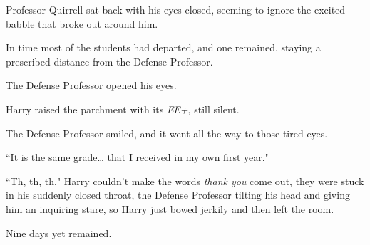 Professor Quirrell sat back with his eyes closed, seeming to ignore the excited babble that broke out around him.

In time most of the students had departed, and one remained, staying a prescribed distance from the Defense Professor.

The Defense Professor opened his eyes.

Harry raised the parchment with its \emph{EE+}, still silent.

The Defense Professor smiled, and it went all the way to those tired eyes.

``It is the same grade{\ldots} that I received in my own first year."

``Th, th, th," Harry couldn't make the words \emph{thank you} come out, they were stuck in his suddenly closed throat, the Defense Professor tilting his head and giving him an inquiring stare, so Harry just bowed jerkily and then left the room.

Nine days yet remained.

